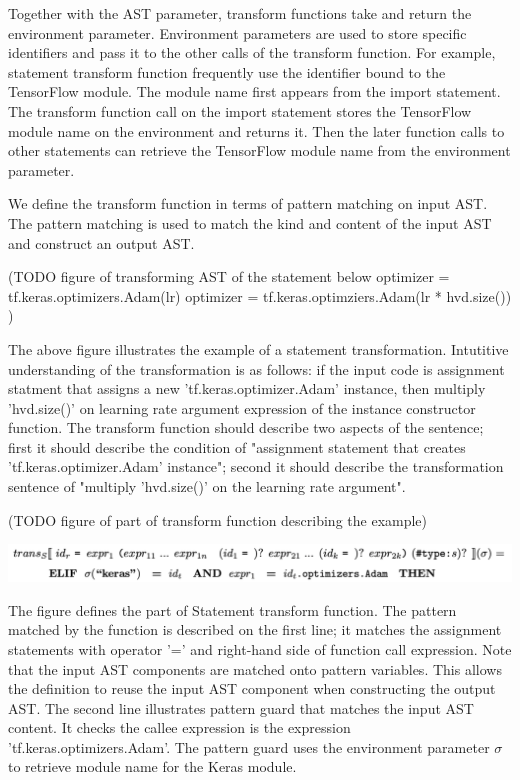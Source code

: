 Together with the AST parameter, transform functions take and return
the environment parameter.
Environment parameters are used to store specific identifiers
and pass it to the other calls of the transform function.
For example, statement transform function frequently use 
the identifier bound to the TensorFlow module.
The module name first appears from the import statement.
The transform function call on the import statement stores
the TensorFlow module name on the environment and returns it.
Then the later function calls to other statements can
retrieve the TensorFlow module name from the environment parameter.

We define the transform function in terms of pattern matching on input AST.
The pattern matching is used to match the kind and content of the input AST
and construct an output AST.

(TODO figure of transforming AST of the statement below
optimizer = tf.keras.optimizers.Adam(lr)
optimizer = tf.keras.optimziers.Adam(lr * hvd.size())
)

The above figure illustrates the example of a statement transformation.
Intutitive understanding of the transformation is as follows:
if the input code is assignment statment 
that assigns a new 'tf.keras.optimizer.Adam' instance,
then multiply 'hvd.size()' on learning rate argument expression of the
instance constructor function.
The transform function should describe two aspects of the sentence;
first it should describe the condition of "assignment statement that
creates 'tf.keras.optimizer.Adam' instance";
second it should describe the transformation sentence
of "multiply 'hvd.size()' on the learning rate argument". 

(TODO figure of part of transform function describing the example) 

\includegraphics[width=15cm]{trans_ex01}

The figure defines the part of Statement transform function. 
The pattern matched by the function is described on the first line;
it matches the assignment statements with operator '=' and
right-hand side of function call expression.
Note that the input AST components are matched onto pattern variables.
This allows the definition to reuse the input AST component
when constructing the output AST.
The second line illustrates pattern guard that matches the input AST content.
It checks the callee expression is the expression 'tf.keras.optimizers.Adam'.
The pattern guard uses the environment parameter $\sigma$ to retrieve
module name for the Keras module.

